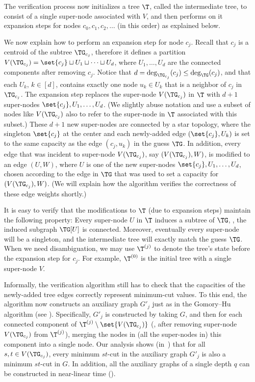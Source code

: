 The verification process now initializes a tree $\T$,
called the intermediate tree,
to consist of a single super-node associated with $V$,
and then performs on it expansion steps for nodes $c_0,c_1,c_2,\ldots$
(in this order) as explained below.

We now explain how to perform an expansion step for node $c_j$.
Recall that $c_j$ is a centroid of the subtree $\TG_{c_j}$,
therefore it defines a partition
$V(\TG_{c_j}) = \set{c_j}\sqcup U_1 \sqcup\dots\sqcup U_d$,
where $U_1,\ldots,U_d$ are the connected components after removing $c_j$.
Notice that $d = \deg_{\TG_{c_j}}(c_j)\leq \deg_{\TG}(c_j)$,
and that each $U_k$, $k\in [d]$, contains exactly one node $u_k\in U_k$
that is a neighbor of $c_j$ in $\TG_{c_j}$.
The expansion step replaces the super-node $V(\TG_{c_j})$ in $\T$
with $d+1$ super-nodes $\set{c_j},U_1,\dots,U_d$.
(We slightly abuse notation and use a subset of nodes like $V(\TG_{c_j})$
also to refer to the super-node in $\T$ associated with this subset.)
%
These $d+1$ new super-nodes are connected by a star topology,
where the singleton $\set{c_j}$ at the center
and each newly-added edge $(\set{c_j}, U_k)$
is set to the same capacity as the edge $(c_j, u_k)$ in the guess $\TG$.
In addition, every edge that was incident to super-node $V(\TG_{c_j})$,
say $(V(\TG_{c_j}),W)$, is modified to an edge $(U,W)$,
where $U$ is one of the new super-nodes $\set{c_j},U_1,\dots,U_d$,
chosen according to the edge in $\TG$ that was used to set
a capacity for $(V(\TG_{c_j}),W)$.
(We will explain how the algorithm verifies the correctness of these edge weights shortly.)

It is easy to verify that the modifications to $\T$ (due to expansion steps)
maintain the following property:
Every super-node $U$ in $\T$ induces a subtree of $\TG$,
\ie, the induced subgraph $\TG[U]$ is connected.
Moreover, eventually every super-node will be a singleton,
and the intermediate tree will exactly match the guess $\TG$.
When we need disambiguation, we may use $\T^{(j)}$
to denote the tree's state before the expansion step for $c_j$.
For example, $\T^{(0)}$ is the initial tree with a single super-node $V$.


Informally, the verification algorithm still has to check that the capacities
of the newly-added tree edges correctly represent minimum-cut values.
To this end, the algorithm now constructs an auxiliary graph $G'_j$
just as in the Gomory--Hu algorithm (see ).
Specifically, $G'_j$ is constructed by taking $G$,
and then for each connected component of $\T^{(j)}\setminus \set{V(\TG_{c_j})}$
(\ie, after removing super-node $V(\TG_{c_j})$ from $\T^{(j)}$),
merging the nodes in (all the super-nodes in) this component into a single node.
%
Our analysis shows (in~)
that for all $s,t\in V(\TG_{c_j})$,
every minimum $st$-cut in the auxiliary graph $G'_j$
is also a minimum $st$-cut in $G$.
In addition, all the auxiliary graphs of a single depth $q$
can be constructed in near-linear time ().


